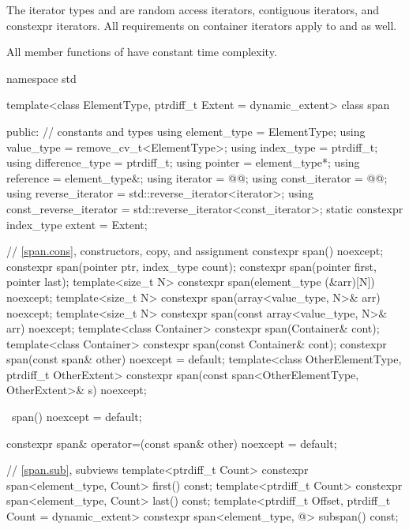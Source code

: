 \begin{codeblock}
\begin{codeblock}
\begin{codeblock}
\pnum
The iterator types  and  are
random access iterators,
contiguous iterators, and
constexpr iterators.
All requirements on container iterators apply to
 and  as well.

\pnum
All member functions of  have constant time complexity.

%
\begin{codeblock}
namespace std {
  template<class ElementType, ptrdiff_t Extent = dynamic_extent>
  class span {
  public:
    // constants and types
    using element_type = ElementType;
    using value_type = remove_cv_t<ElementType>;
    using index_type = ptrdiff_t;
    using difference_type = ptrdiff_t;
    using pointer = element_type*;
    using reference = element_type&;
    using iterator = @@;
    using const_iterator = @@;
    using reverse_iterator = std::reverse_iterator<iterator>;
    using const_reverse_iterator = std::reverse_iterator<const_iterator>;
    static constexpr index_type extent = Extent;

    // \ref{span.cons}, constructors, copy, and assignment
    constexpr span() noexcept;
    constexpr span(pointer ptr, index_type count);
    constexpr span(pointer first, pointer last);
    template<size_t N>
      constexpr span(element_type (&arr)[N]) noexcept;
    template<size_t N>
      constexpr span(array<value_type, N>& arr) noexcept;
    template<size_t N>
      constexpr span(const array<value_type, N>& arr) noexcept;
    template<class Container>
      constexpr span(Container& cont);
    template<class Container>
      constexpr span(const Container& cont);
    constexpr span(const span& other) noexcept = default;
    template<class OtherElementType, ptrdiff_t OtherExtent>
      constexpr span(const span<OtherElementType, OtherExtent>& s) noexcept;

    ~span() noexcept = default;

    constexpr span& operator=(const span& other) noexcept = default;

    // \ref{span.sub}, subviews
    template<ptrdiff_t Count>
      constexpr span<element_type, Count> first() const;
    template<ptrdiff_t Count>
      constexpr span<element_type, Count> last() const;
    template<ptrdiff_t Offset, ptrdiff_t Count = dynamic_extent>
      constexpr span<element_type, @\seebelow@> subspan() const;

}}
\end{codeblock}
\end{codeblock}
\end{codeblock}
\end{codeblock}
